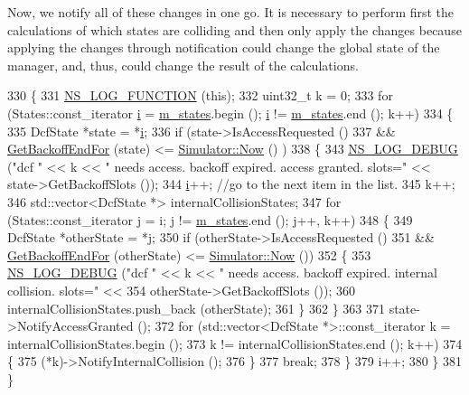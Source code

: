 Now, we notify all of these changes in one go. It is necessary to perform first the calculations of which states are colliding and then only apply the changes because applying the changes through notification could change the global state of the manager, and, thus, could change the result of the calculations.
\begin{DoxyCode}
330 \{
331   \hyperlink{log-macros-disabled_8h_a90b90d5bad1f39cb1b64923ea94c0761}{NS\_LOG\_FUNCTION} (\textcolor{keyword}{this});
332   uint32\_t k = 0;
333   \textcolor{keywordflow}{for} (States::const\_iterator \hyperlink{bernuolliDistribution_8m_a6f6ccfcf58b31cb6412107d9d5281426}{i} = \hyperlink{classns3_1_1DcfManager_a4999c9465af21e3ff6e0949f28f17466}{m\_states}.begin (); \hyperlink{bernuolliDistribution_8m_a6f6ccfcf58b31cb6412107d9d5281426}{i} != \hyperlink{classns3_1_1DcfManager_a4999c9465af21e3ff6e0949f28f17466}{m\_states}.end (); k++)
334     \{
335       DcfState *state = *\hyperlink{bernuolliDistribution_8m_a6f6ccfcf58b31cb6412107d9d5281426}{i};
336       \textcolor{keywordflow}{if} (state->IsAccessRequested ()
337           && \hyperlink{classns3_1_1DcfManager_a2a7e76982a4ebc1c2df5608efc111c33}{GetBackoffEndFor} (state) <= \hyperlink{classns3_1_1Simulator_ac3178fa975b419f7875e7105be122800}{Simulator::Now} () )
338         \{
343           \hyperlink{group__logging_ga413f1886406d49f59a6a0a89b77b4d0a}{NS\_LOG\_DEBUG} (\textcolor{stringliteral}{"dcf "} << k << \textcolor{stringliteral}{" needs access. backoff expired. access granted. slots="}
       << state->GetBackoffSlots ());
344           \hyperlink{bernuolliDistribution_8m_a6f6ccfcf58b31cb6412107d9d5281426}{i}++; \textcolor{comment}{//go to the next item in the list.}
345           k++;
346           std::vector<DcfState *> internalCollisionStates;
347           \textcolor{keywordflow}{for} (States::const\_iterator j = i; j != \hyperlink{classns3_1_1DcfManager_a4999c9465af21e3ff6e0949f28f17466}{m\_states}.end (); j++, k++)
348             \{
349               DcfState *otherState = *j;
350               \textcolor{keywordflow}{if} (otherState->IsAccessRequested ()
351                   && \hyperlink{classns3_1_1DcfManager_a2a7e76982a4ebc1c2df5608efc111c33}{GetBackoffEndFor} (otherState) <= 
      \hyperlink{classns3_1_1Simulator_ac3178fa975b419f7875e7105be122800}{Simulator::Now} ())
352                 \{
353                   \hyperlink{group__logging_ga413f1886406d49f59a6a0a89b77b4d0a}{NS\_LOG\_DEBUG} (\textcolor{stringliteral}{"dcf "} << k << \textcolor{stringliteral}{" needs access. backoff expired. internal
       collision. slots="} <<
354                                 otherState->GetBackoffSlots ());
360                   internalCollisionStates.push\_back (otherState);
361                 \}
362             \}
363 
371           state->NotifyAccessGranted ();
372           \textcolor{keywordflow}{for} (std::vector<DcfState *>::const\_iterator k = internalCollisionStates.begin ();
373                k != internalCollisionStates.end (); k++)
374             \{
375               (*k)->NotifyInternalCollision ();
376             \}
377           \textcolor{keywordflow}{break};
378         \}
379       i++;
380     \}
381 \}
\end{DoxyCode}


